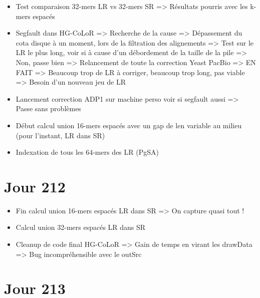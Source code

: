 \documentclass[12pt]{report}
\begin{document}
\begin{itemize}
	\item Test comparaison 32-mers LR vs 32-mers SR => Résultats pourris avec les k-mers espacés
	
	\item Segfault dans HG-CoLoR => Recherche de la cause
			=> Dépassement du cota disque à un moment, lors de la filtration des alignements
			=> Test sur le LR le plus long, voir si à cause d'un débordement de la taille de la pile => Non, passe bien
			=> Relancement de toute la correction Yeast PacBio
			=> EN FAIT => Beaucoup trop de LR à corriger, beaucoup trop long, pas viable
					   => Besoin d'un nouveau jeu de LR
					   
	\item Lancement correction ADP1 sur machine perso voir si segfault aussi => Passe sans problèmes
	
	\item Début calcul union 16-mers espacés avec un gap de len variable au milieu (pour l'instant, LR dans SR)
	
	\item Indexation de tous les 64-mers des LR (PgSA)
\end{itemize}

\section{Jour 212}

\begin{itemize}
	\item Fin calcul union 16-mers espacés LR dans SR => On capture quasi tout !
	
	\item Calcul union 32-mers espacés LR dans SR 
	
	\item Cleanup de code final HG-CoLoR 
			=> Gain de temps en virant les drawData
		    => Bug incompréhensible avec le outSrc
\end{itemize}

\section{Jour 213}
\end{document}
